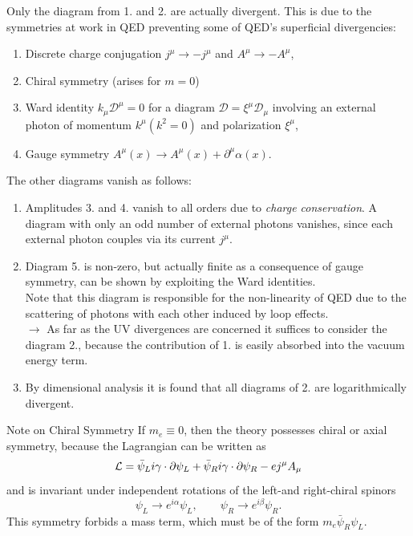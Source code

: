 Only the diagram from 1. and 2. are actually divergent. This is due to the symmetries at work in QED preventing some of QED's superficial divergencies:
\begin{enumerate}
	\item Discrete charge conjugation $j^{\mu} \rightarrow - j^{\mu}$ and $A^{\mu} \rightarrow - A^{\mu}$,
	\item Chiral symmetry (arises for $m=0$)
	\item Ward identity $k_{\mu}\mathcal{D}^{\mu} =0$ for a diagram $\mathcal{D}= \xi^{\mu} \mathcal{D}_{\mu}$ involving an external photon of momentum $k^{\mu} ( k^2 =0)$ and polarization $\xi^{\mu}$,
	\item Gauge symmetry $A^{\mu}(x) \rightarrow A^{\mu}(x) + \partial^{\mu} \alpha(x)$.
\end{enumerate}
The other diagrams vanish as follows:
\begin{enumerate}
	\item Amplitudes 3. and 4. vanish to all orders due to \emph{charge conservation}. A diagram with only an odd number of external photons vanishes, since each external photon couples via its current $j^{\mu}$.
	\item Diagram 5. is non-zero, but actually finite as a consequence of gauge symmetry, can be shown by exploiting the Ward identities.\\
	Note that this diagram is responsible for the non-linearity of QED due to the scattering of photons with each other induced by loop effects.\\
	$\rightarrow$ As far as the UV divergences are concerned it suffices to consider the diagram 2., because the contribution of 1. is easily absorbed into the vacuum energy term.
	\item By dimensional analysis it is found that all diagrams of 2. are logarithmically divergent.
\end{enumerate}
\begin{mybox}{Note on Chiral Symmetry}
	If $m_e \equiv 0$, then the theory possesses chiral or axial symmetry, because the Lagrangian can be written as
	\begin{equation}
		\mathcal{L} = \bar{\psi}_L i \gamma \cdot \partial \psi_L + \bar{\psi}_R i \gamma \cdot \partial \psi_R - e j^{\mu} A_{\mu}
	\end{equation}
	and is invariant under independent rotations of the left-and right-chiral spinors
	\begin{equation}
		\psi_L \rightarrow e^{i \alpha} \psi_L, \qquad \psi_R \rightarrow e^{i \beta} \psi_R.
	\end{equation}
	This symmetry forbids a mass term, which must be of the form $m_e \bar{\psi}_R \psi_L$.

\end{mybox}

